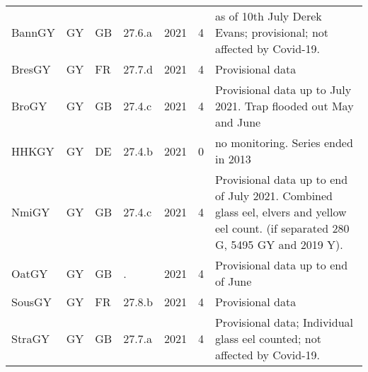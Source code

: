 \begin{table}[htbp]
\begin{tabular}{p{1.5cm}p{1.5cm}p{1.5cm}p{1cm}p{1cm}p{1cm}p{8cm}}
  BannGY & GY & GB & 27.6.a & 2021 &   4 & as of 10th July Derek Evans; provisional; not affected by Covid-19. \\ 
  BresGY & GY & FR & 27.7.d & 2021 &   4 & Provisional data \\ 
  BroGY & GY & GB & 27.4.c & 2021 &   4 & Provisional data up to July 2021. Trap flooded out May and June \\ 
  HHKGY & GY & DE & 27.4.b & 2021 &   0 & no monitoring. Series ended in 2013 \\ 
  NmiGY & GY & GB & 27.4.c & 2021 &   4 & Provisional data up to end of July 2021. Combined glass eel, elvers and yellow eel count. (if separated 280 G, 5495 GY and 2019 Y). \\ 
  OatGY & GY & GB & . & 2021 &   4 & Provisional data up to end of June \\ 
  SousGY & GY & FR & 27.8.b & 2021 &   4 & Provisional data \\ 
  StraGY & GY & GB & 27.7.a & 2021 &   4 & Provisional data; Individual glass eel counted; not affected by Covid-19. \\ 
   \hline
\end{tabular}
\end{table}
